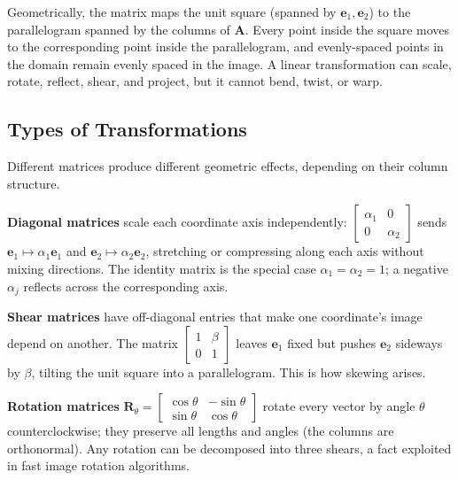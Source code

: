 \documentclass[main.tex]{subfiles}
\begin{document}
Geometrically, the matrix maps the unit square (spanned by $\mathbf{e}_1, \mathbf{e}_2$) to the parallelogram spanned by the columns of $\mathbf{A}$. Every point inside the square moves to the corresponding point inside the parallelogram, and evenly-spaced points in the domain remain evenly spaced in the image. A linear transformation can scale, rotate, reflect, shear, and project, but it cannot bend, twist, or warp.

\subsection{Types of Transformations}

Different matrices produce different geometric effects, depending on their column structure.

\textbf{Diagonal matrices} scale each coordinate axis independently: $\begin{bmatrix}\alpha_1 & 0 \\ 0 & \alpha_2\end{bmatrix}$ sends $\mathbf{e}_1 \mapsto \alpha_1\mathbf{e}_1$ and $\mathbf{e}_2 \mapsto \alpha_2\mathbf{e}_2$, stretching or compressing along each axis without mixing directions. The identity matrix is the special case $\alpha_1 = \alpha_2 = 1$; a negative $\alpha_j$ reflects across the corresponding axis.

\textbf{Shear matrices} have off-diagonal entries that make one coordinate's image depend on another. The matrix $\begin{bmatrix}1 & \beta \\ 0 & 1\end{bmatrix}$ leaves $\mathbf{e}_1$ fixed but pushes $\mathbf{e}_2$ sideways by $\beta$, tilting the unit square into a parallelogram. This is how skewing arises.

\textbf{Rotation matrices} $\mathbf{R}_\theta = \begin{bmatrix}\cos\theta & -\sin\theta \\ \sin\theta & \cos\theta\end{bmatrix}$ rotate every vector by angle $\theta$ counterclockwise; they preserve all lengths and angles (the columns are orthonormal). Any rotation can be decomposed into three shears, a fact exploited in fast image rotation algorithms.
\end{document}
